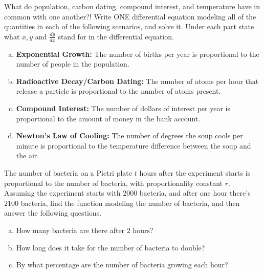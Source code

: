 \documentclass[answers]{exam}
\begin{document}
\begin{questions}
\question What do population, carbon dating, compound interest, and temperature have in common with one another?! Write ONE differential equation modeling all of the quantities in each of the following scenarios, and solve it. Under each part state what $x, y$ and $\frac{dy}{dx}$ stand for in the differential equation.

\begin{enumerate}[(a)]
	\item \textbf{Exponential Growth:} The number of births per year is proportional to the number of people in the population. 
	\item \textbf{Radioactive Decay/Carbon Dating:} The number of atoms per hour that release a particle is proportional to the number of atoms present. 
	\item \textbf{Compound Interest:} The number of dollars of interest per year is proportional to the amount of money in the bank account.
	\item \textbf{Newton's Law of Cooling:} The number of degrees the soup cools per minute is proportional to the temperature difference between the soup and the air. 
\end{enumerate}

\hfill \break
\hfill \break
\hfill \break
\hfill \break
\hfill \break

\question The number of bacteria on a Pietri plate $t$ hours after the experiment starts is proportional to the number of bacteria, with proportionality constant $r$. Assuming the experiment starts with $2000$ bacteria, and after one hour there's $2100$ bacteria, find the function modeling the number of bacteria, and then answer the following questions.

\hfill \break
\hfill \break
\hfill \break
\hfill \break
\hfill \break
\hfill \break
\hfill \break
\hfill \break
\hfill \break
\hfill \break

\begin{enumerate}[(a)]
	\item How many bacteria are there after $2$ hours?
	
	\hfill \break
	\hfill \break
	
	\item How long does it take for the number of bacteria to double?
	
	\hfill \break
	\hfill \break
	\hfill \break
	\hfill \break
	
	\item By what percentage are the number of bacteria growing each hour?
\end{enumerate}




\end{questions}
\end{document}
